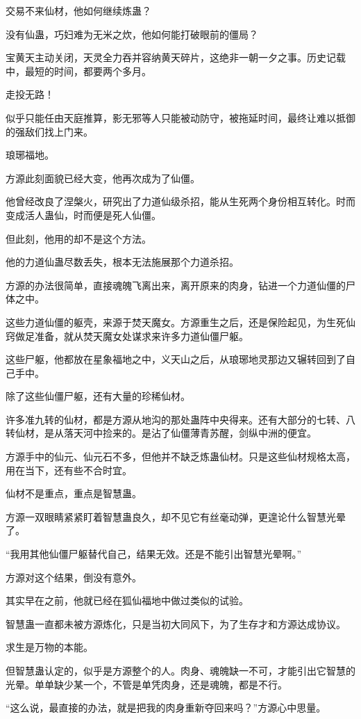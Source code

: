 \begin{this_body}
交易不来仙材，他如何继续炼蛊？

没有仙蛊，巧妇难为无米之炊，他如何能打破眼前的僵局？

宝黄天主动关闭，天灵全力吞并容纳黄天碎片，这绝非一朝一夕之事。历史记载中，最短的时间，都要两个多月。

走投无路！

似乎只能任由天庭推算，影无邪等人只能被动防守，被拖延时间，最终让难以抵御的强敌们找上门来。

琅琊福地。

方源此刻面貌已经大变，他再次成为了仙僵。

他曾经改良了涅槃火，研究出了力道仙级杀招，能从生死两个身份相互转化。时而变成活人蛊仙，时而便是死人仙僵。

但此刻，他用的却不是这个方法。

他的力道仙蛊尽数丢失，根本无法施展那个力道杀招。

方源的办法很简单，直接魂魄飞离出来，离开原来的肉身，钻进一个力道仙僵的尸体之中。

这些力道仙僵的躯壳，来源于焚天魔女。方源重生之后，还是保险起见，为生死仙窍做足准备，就从焚天魔女处谋求来许多力道仙僵尸躯。

这些尸躯，他都放在星象福地之中，义天山之后，从琅琊地灵那边又辗转回到了自己手中。

除了这些仙僵尸躯，还有大量的珍稀仙材。

许多准九转的仙材，都是方源从地沟的那处蛊阵中央得来。还有大部分的七转、八转仙材，是从落天河中捡来的。是沾了仙僵薄青苏醒，剑纵中洲的便宜。

方源手中的仙元、仙元石不多，但他并不缺乏炼蛊仙材。只是这些仙材规格太高，用在当下，还有些不合时宜。

仙材不是重点，重点是智慧蛊。

方源一双眼睛紧紧盯着智慧蛊良久，却不见它有丝毫动弹，更遑论什么智慧光晕了。

“我用其他仙僵尸躯替代自己，结果无效。还是不能引出智慧光晕啊。”

方源对这个结果，倒没有意外。

其实早在之前，他就已经在狐仙福地中做过类似的试验。

智慧蛊一直都未被方源炼化，只是当初大同风下，为了生存才和方源达成协议。

求生是万物的本能。

但智慧蛊认定的，似乎是方源整个的人。肉身、魂魄缺一不可，才能引出它智慧的光晕。单单缺少某一个，不管是单凭肉身，还是魂魄，都是不行。

“这么说，最直接的办法，就是把我的肉身重新夺回来吗？”方源心中思量。


\end{this_body}
